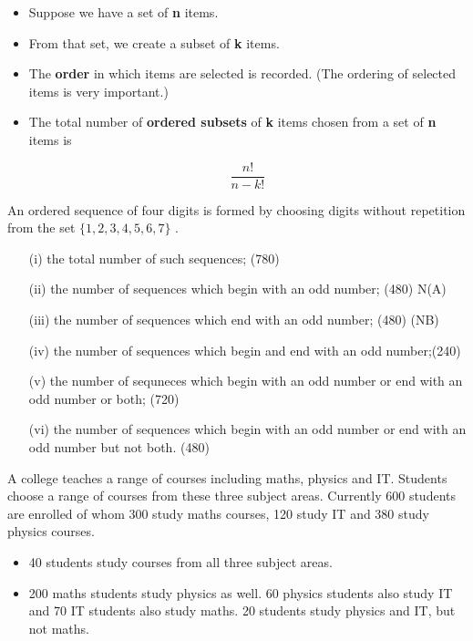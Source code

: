 \documentclass[12pt]{report}
\begin{document}
	\newpage
	{\Large
		\begin{itemize}
			
			\item Suppose we have a set of \textbf{n} items.
			\item From that set, we create a subset of \textbf{k} items.
			\item The \textbf{order} in which items are selected is recorded. (The ordering of selected items is very important.) 
			\item The total number of \textbf{ordered subsets} of \textbf{k} items chosen from a set of \textbf{n} items is
			
			\[\frac{n!}{n-k!}\]
		\end{itemize}
	}
	
	
	An ordered sequence of four digits is formed by choosing digits without
	repetition from the set $\{1, 2, 3, 4, 5, 6, 7\}$ .
	
	\begin{itemize}
		\item[(i)] the total number of such sequences; (780)
		\item[(ii)] the number of sequences which begin with an odd number; (480) N(A)
		\item[(iii)] the number of sequences which end with an odd number; (480) (NB)
		\item[(iv)] the number of sequences which begin and end with an odd number;(240)
		\item[(v)] the number of sequneces which begin with an odd number or end with an
		odd number or both; (720)
		\item[(vi)] the number of sequences which begin with an odd number or end with an
		odd number but not both. (480)
	\end{itemize}
	
	
	
	A college teaches a range of courses including maths, physics and IT.
	Students choose a range of courses from these three subject areas. Currently 600
	students are enrolled of whom 300 study maths courses, 120 study IT
	and 380 study physics courses. 
	
	\begin{itemize}
		\item 40 students study courses from all three subject
		areas. 
		\item 200 maths students study physics as well. 60 physics students
		also study IT and 70 IT students also study maths. 20 students study physics and IT, but not maths.
	\end{itemize}
	
\end{document}
